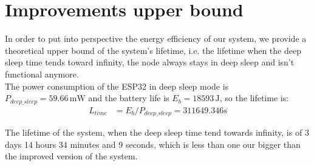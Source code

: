 \section{Improvements upper bound}
In order to put into perspective the energy efficiency of our system, we provide a theoretical upper bound of the system's lifetime, i.e. the lifetime when the deep sleep time tends toward infinity, the node always stays in deep sleep and isn't functional anymore.\\
The power consumption of the ESP32 in deep sleep mode is $P_{deep\_sleep} = 59.66\,\text{mW}$ and the battery life is $E_{b} = 18593\,\text{J}$, so the lifetime is:
\begin{align*}
	L_{time}&= E_{b} / P_{deep\_sleep} = 311649.346 \text{s}
\end{align*}

The lifetime of the system, when the deep sleep time tend towards infinity, is of 3 days 14 hours 34 minutes and 9 seconds, which is less than one our bigger than the improved version of the system.









